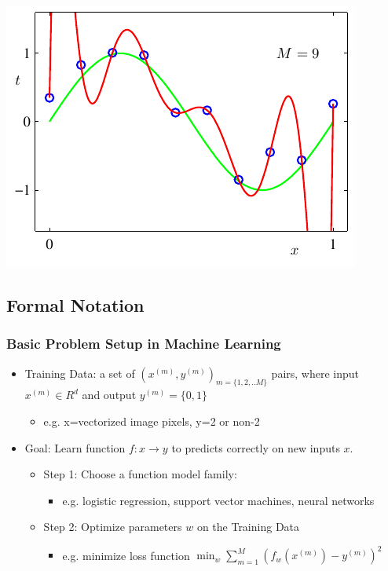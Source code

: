\documentclass{beamer}
\newcommand{\bi}{\begin{itemize}}
\newcommand{\ei}{\end{itemize}}
\begin{document}
\begin{frame}
\begin{center}
\includegraphics[scale=0.55]{figs/polyfit_d}
\end{center}
\end{frame}



\subsection[Notation]{Formal Notation}

\begin{frame}
\frametitle{Basic Problem Setup in Machine Learning}
\bi
\item Training Data: a set of $(x^{(m)},y^{(m)})_{m=\{1,2,..M\}}$ pairs, where input $x^{(m)} \in R^d$ and output $y^{(m)}=\{0,1\}$ 
	\bi
	\item e.g. x=vectorized image pixels, y=2 or non-2
	\ei
\item Goal: Learn function $f: x \rightarrow y$ to predicts correctly on new inputs $x$.
\pause
\bi
\item Step 1: Choose a function model family:
	\bi
	\item e.g. logistic regression, support vector machines, neural networks
	\ei
\pause
\item Step 2: Optimize parameters $w$ on the Training Data
	\bi 
	\item e.g. minimize loss function $\min_{w} \sum_{m=1}^M  ( f_w(x^{(m)}) - y^{(m)} )^2$
	\ei
\ei
\ei
\end{frame}

\end{document}
